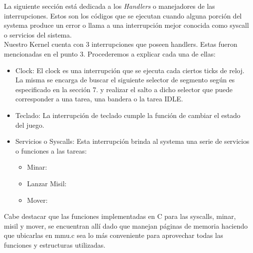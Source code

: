 La siguiente secci\'on est\'a dedicada a los \emph{Handlers} o manejadores de las interrupciones. Estos son los c\'odigos que se ejecutan
cuando alguna porci\'on del systema produce un error o llama a una interrupci\'on mejor conocida como syscall o servicios del sistema.\\
Nuestro Kernel cuenta con 3 interrupciones que poseen handlers. Estas fueron mencionadas en el punto 3. Procederemos a explicar cada una de
ellas:
\begin{itemize}
 \item Clock: El clock es una interrupci\'on que se ejecuta cada ciertos ticks de reloj. La misma se encarga de buscar el siguiente selector
de segmento según es especificado en la secci\'on 7. y realizar el salto a dicho selector que puede corresponder a una tarea, una bandera o 
la tarea IDLE.
 \item Teclado: La interrupci\'on de teclado cumple la funci\'on de cambiar el estado del juego.
 \item Servicios o Syscalls: Esta interrupci\'on brinda al systema una serie de servicios o funciones a las tareas:
  \begin{itemize}
   \item Minar:
   \item Lanzar Misil:
   \item Mover: 
  \end{itemize}

\end{itemize}

Cabe destacar que las funciones implementadas en C para las syscalls, minar, misil y mover, se encuentran allí dado que manejan p\'aginas
de memoria haciendo que ubicarlas en mmu.c sea lo m\'as conveniente para aprovechar todas las funciones y estructuras utilizadas. 
